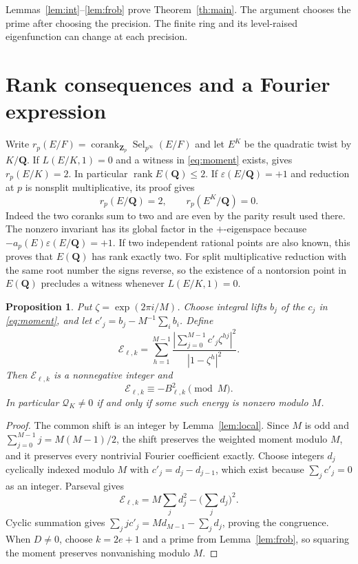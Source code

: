 \documentclass[11pt]{article}
\newtheorem{proposition}[theorem]{Proposition}
\newcommand{\Z}{\mathbf Z}
\newcommand{\Q}{\mathbf Q}
\newcommand{\Sel}{\operatorname{Sel}}
\begin{document}
Lemmas~\ref{lem:int}--\ref{lem:frob} prove Theorem~\ref{th:main}. The argument chooses the prime after choosing the precision. The finite ring and its level-raised eigenfunction can change at each precision.

\section{Rank consequences and a Fourier expression}

Write \(r_p(E/F)=\operatorname{corank}_{\Z_p}\Sel_{p^\infty}(E/F)\) and let \(E^K\) be the quadratic twist by \(K/\Q\). If \(L(E/K,1)=0\) and a witness in \eqref{eq:moment} exists, \cite[Thm.~3.4]{FG} gives \(r_p(E/K)=2\). In particular \(\operatorname{rank}E(\Q)\leq2\). If \(\varepsilon(E/\Q)=+1\) and reduction at \(p\) is nonsplit multiplicative, its proof gives
\[
                  r_p(E/\Q)=2,\qquad r_p(E^K/\Q)=0 .
\]
Indeed the two coranks sum to two and are even by the parity result used there. The nonzero invariant has its global factor in the \(+\)-eigenspace because \(-a_p(E)\varepsilon(E/\Q)=+1\). If two independent rational points are also known, this proves that \(E(\Q)\) has rank exactly two. For split multiplicative reduction with the same root number the signs reverse, so the existence of a nontorsion point in \(E(\Q)\) precludes a witness whenever \(L(E/K,1)=0\).

\begin{proposition}
Put \(\zeta=\exp(2\pi i/M)\). Choose integral lifts \(b_j\) of the \(c_j\) in \eqref{eq:moment}, and let \(c'_j=b_j-M^{-1}\sum_i b_i\). Define
\[
 \mathcal E_{\ell,k}
  =\sum_{h=1}^{M-1}\frac{\left|\sum_{j=0}^{M-1}c'_j\zeta^{hj}\right|^2}
                           {|1-\zeta^h|^2}.
\]
Then \(\mathcal E_{\ell,k}\) is a nonnegative integer and
\[
                  \mathcal E_{\ell,k}\equiv - B_{\ell,k}^2 \pmod M .
\]
In particular \(\mathcal Q_K\neq0\) if and only if some such energy is nonzero modulo \(M\).
\end{proposition}
\begin{proof}
The common shift is an integer by Lemma~\ref{lem:local}. Since \(M\) is odd and \(\sum_{j=0}^{M-1}j=M(M-1)/2\), the shift preserves the weighted moment modulo \(M\), and it preserves every nontrivial Fourier coefficient exactly. Choose integers \(d_j\) cyclically indexed modulo \(M\) with \(c'_j=d_j-d_{j-1}\), which exist because \(\sum_j c'_j=0\) as an integer. Parseval gives
\[
  \mathcal E_{\ell,k}=M\sum_j d_j^2-\Big(\sum_jd_j\Big)^2 .
\]
Cyclic summation gives \(\sum_jj c'_j=Md_{M-1}-\sum_jd_j\), proving the congruence. When \(D\neq0\), choose \(k=2e+1\) and a prime from Lemma~\ref{lem:frob}, so squaring the moment preserves nonvanishing modulo \(M\).
\end{proof}
\end{document}

